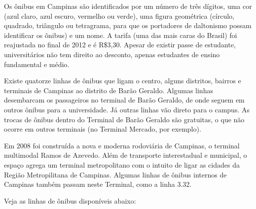 Os ônibus em Campinas são identificados por um número de três dígitos, uma cor
(azul claro, azul escuro, vermelho ou verde), uma figura geométrica (círculo,
quadrado, triângulo ou tetragrama, para que os portadores de daltonismo possam
identificar os ônibus) e um nome. A tarifa (uma das mais caras do Brasil) foi
reajustada no final de 2012 e é R\$3,30. Apesar de existir passe de estudante,
universitários não tem direito ao desconto, apenas estudantes de ensino
fundamental e médio.

Existe quatorze linhas de ônibus que ligam o centro, alguns distritos, bairros
e terminais de Campinas ao distrito de Barão Geraldo. Algumas linhas desembarcam
os passageiros no terminal de Barão Geraldo, de onde seguem em outros ônibus
para a universidade. Já outras linhas vão direto para o campus. As trocas de
ônibus dentro do Terminal de Barão Geraldo são gratuitas, o que não ocorre em
outros terminais (no Terminal Mercado, por exemplo).

Em 2008 foi construída a nova e moderna rodoviária de Campinas, o terminal
multimodal Ramos de Azevedo. Além de transporte interestadual e municipal,
o espaço agrega um terminal metropolitano com o intuito de ligar as cidades da
Região Metropilitana de Campinas. Algumas linhas de ônibus internos de Campinas
também passam neste Terminal, como a linha 3.32.

Veja as linhas de ônibus disponíveis abaixo:

